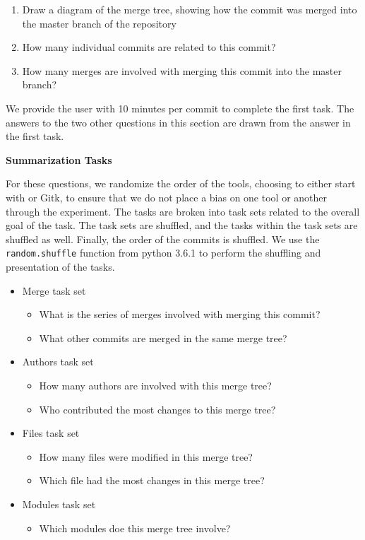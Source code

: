 \begin{enumerate}
  \item Draw a diagram of the merge tree, showing how the commit was
    merged into the master branch of the repository
  \item How many individual commits are related to this commit?
  \item How many merges are involved with merging this commit into the
    master branch?
\end{enumerate}

We provide the user with 10 minutes per commit to complete the first
task. The answers to the two other questions in this section are drawn
from the answer in the first task.

\textbf{Summarization Tasks}

For these questions, we randomize the order of the tools, choosing to
either start with \tool or Gitk, to ensure that we do not place a bias
on one tool or another through the experiment. The tasks are broken
into task sets related to the overall goal of the task. The task sets
are shuffled, and the tasks within the task sets are shuffled as well.
Finally, the order of the commits is shuffled. We use the
\verb|random.shuffle| function from python 3.6.1 to perform the
shuffling and presentation of the tasks.

\begin{itemize}
  \item Merge task set
    \begin{itemize}
      \item What is the series of merges involved with merging this
        commit?
      \item What other commits are merged in the same merge tree?
    \end{itemize}

  \item Authors task set
    \begin{itemize}
      \item How many authors are involved with this merge tree?
      \item Who contributed the most changes to this merge tree?
    \end{itemize}

  \item Files task set
    \begin{itemize}
      \item How many files were modified in this merge tree?
      \item Which file had the most changes in this merge tree?
    \end{itemize}

  \item Modules task set
    \begin{itemize}
      \item Which modules doe this merge tree involve?
    \end{itemize}
\end{itemize}


